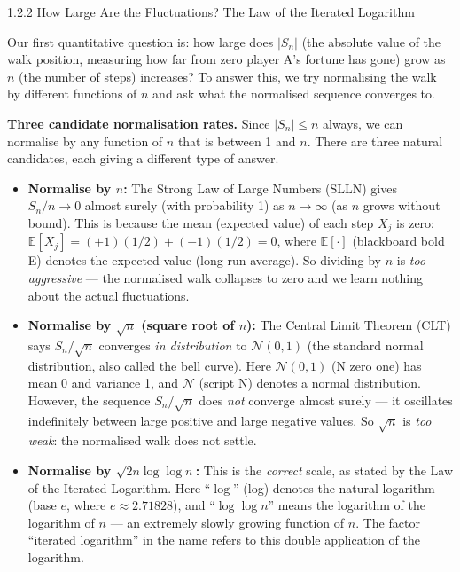 \documentclass[aspectratio=169,10pt]{beamer}
\begin{document}
\begin{frame}[allowframebreaks]{1.2.2 How Large Are the Fluctuations? The Law of the Iterated Logarithm}

  Our first quantitative question is: how large does $|S_n|$ (the absolute
  value of the walk position, measuring how far from zero player A's fortune
  has gone) grow as $n$ (the number of steps) increases?  To answer this, we
  try normalising the walk by different functions of $n$ and ask what the
  normalised sequence converges to.

  \textbf{Three candidate normalisation rates.}  Since $|S_n| \le n$ always,
  we can normalise by any function of $n$ that is between 1 and $n$.  There
  are three natural candidates, each giving a different type of answer.

  \begin{itemize}
    \item \textbf{Normalise by $n$:} The Strong Law of Large Numbers (SLLN)
      gives $S_n/n \to 0$ almost surely (with probability 1) as
      $n \to \infty$ (as $n$ grows without bound).  This is because the mean
      (expected value) of each step $X_j$ is zero:
      $\mathbb{E}[X_j] = (+1)(1/2) + (-1)(1/2) = 0$, where $\mathbb{E}[\cdot]$
      (blackboard bold E) denotes the expected value (long-run average).  So
      dividing by $n$ is \emph{too aggressive} --- the normalised walk
      collapses to zero and we learn nothing about the actual fluctuations.

    \item \textbf{Normalise by $\sqrt{n}$ (square root of $n$):}  The Central
      Limit Theorem (CLT) says $S_n / \sqrt{n}$ converges \emph{in
      distribution} to $\mathcal{N}(0,1)$ (the standard normal distribution,
      also called the bell curve).  Here $\mathcal{N}(0,1)$ (N zero one) has
      mean 0 and variance 1, and $\mathcal{N}$ (script N) denotes a normal
      distribution.  However, the sequence $S_n/\sqrt{n}$ does \emph{not}
      converge almost surely --- it oscillates indefinitely between large
      positive and large negative values.  So $\sqrt{n}$ is \emph{too weak}:
      the normalised walk does not settle.

    \item \textbf{Normalise by $\sqrt{2n \log \log n}$:}  This is the
      \emph{correct} scale, as stated by the Law of the Iterated Logarithm.
      Here ``$\log$'' (log) denotes the natural logarithm (base $e$, where
      $e \approx 2.71828$), and ``$\log \log n$'' means the logarithm of the
      logarithm of $n$ --- an extremely slowly growing function of $n$.
      The factor ``iterated logarithm'' in the name refers to this double
      application of the logarithm.
  \end{itemize}


\end{frame}
\end{document}
